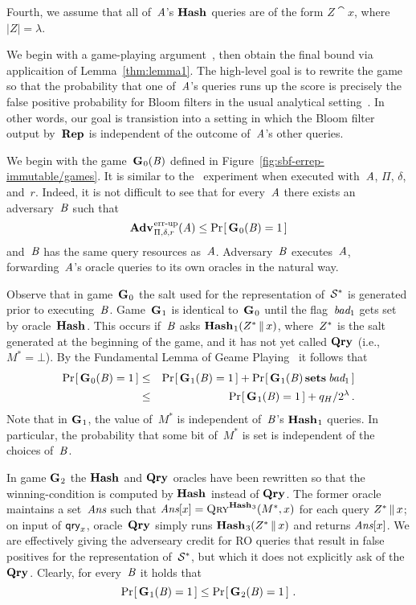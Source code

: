 Fourth, we assume that all of~$\mathit{A}$'s $\textup{\textbf{Hash}}\hspace{0.5pt}$ queries are of the form $Z\cat
x$, where $|Z| = \lambda$.

We begin with a game-playing argument~\cite{bellare2006triple}, then obtain the
final bound via applicaition of Lemma~\ref{thm:lemma1}.
%
%
The high-level goal is to rewrite the game so that the probability that one
of~$\mathit{A}$'s queries runs up the score is precisely the false positive
probability for Bloom filters in the usual analytical
setting~\cite{kirsch2006less}. In other words, our goal is transistion into a
setting in which the Bloom filter output by~$\textup{\textbf{Rep}}\hspace{0.5pt}$ is independent of the
outcome of~$\mathit{A}$'s other queries.

We begin with the game~$\textup{\textbf{G}}\hspace{0.5pt}_0(\mathit{B})$ defined in
Figure~\ref{fig:sbf-errep-immutable/games}. It is similar to the \errep\ experiment when
executed with~$\mathit{A}$, $\Pi$, $\delta$, and~$r$. Indeed, it is not difficult to
see that for every~$\mathit{A}$ there exists an adversary~$\mathit{B}$ such that
\begin{equation}
  \Adv{\errep}_{\Pi,\delta,r}(\advA) \leq \Prob{\game_0(\advB) = 1}
\end{equation}
and~$\mathit{B}$ has the same query resources as~$\mathit{A}$.
%
Adversary~$\mathit{B}$ executes~$\mathit{A}$, forwarding~$\mathit{A}$'s oracle queries
to its own oracles in the natural way.

Observe that in game~$\textup{\textbf{G}}\hspace{0.5pt}_0$ the salt used for the representation of~$\mathcal{S}^*$
is generated prior to executing~$\mathit{B}$. Game~$\textup{\textbf{G}}\hspace{0.5pt}_1$ is identical
to~$\textup{\textbf{G}}\hspace{0.5pt}_0$ until the flag~$\textit{bad}_1$ gets set by oracle~$\textup{\textbf{Hash}}\hspace{0.5pt}$. This occurs
if~$\mathit{B}$ asks $\textup{\textbf{Hash}}\hspace{0.5pt}_1(Z^* \, \| \, x)$, where~$Z^*$ is the salt generated
at the beginning of the game, and it has not yet called $\textup{\textbf{Qry}}\hspace{0.5pt}$ (i.e.,
$M^*=\bot$).
%
By the Fundamental Lemma of Geame Playing~\cite{bellare2006triple} it follows
that
%
\begin{eqnarray}
  \Pr\hspace{-1pt}\left[\,\textup{\textbf{G}}\hspace{0.5pt}_0(\mathit{B})=1\,\right] &\leq&
    \Pr\hspace{-1pt}\left[\,\textup{\textbf{G}}\hspace{0.5pt}_1(\mathit{B})=1\,\right] + \Pr\hspace{-1pt}\left[\,\textup{\textbf{G}}\hspace{0.5pt}_1(\mathit{B}) \,\textup{\textbf{sets}}\hspace{0.5pt}\, \textit{bad}_1\,\right]\\
  &\leq&
    \Pr\hspace{-1pt}\left[\,\textup{\textbf{G}}\hspace{0.5pt}_1(\mathit{B})=1\,\right] + q_H/2^\lambda \,.
\end{eqnarray}
%
Note that in $\textup{\textbf{G}}\hspace{0.5pt}_1$, the value of~$M^*$ is independent of~$\mathit{B}$'s
$\textup{\textbf{Hash}}\hspace{0.5pt}_1$ queries. In particular, the probability that some bit of~$M^*$ is set
is independent of the choices of~$\mathit{B}$.

In game $\textup{\textbf{G}}\hspace{0.5pt}_2$ the $\textup{\textbf{Hash}}\hspace{0.5pt}$ and $\textup{\textbf{Qry}}\hspace{0.5pt}$ oracles have been rewritten so that
the winning-condition is computed by $\textup{\textbf{Hash}}\hspace{0.5pt}$ instead of $\textup{\textbf{Qry}}\hspace{0.5pt}$. The former
oracle maintains a set~$\textit{Ans}$ such that $\textit{Ans}[x] = \textnormal{\textsc{Qry}}^{\textup{\textbf{Hash}}\hspace{0.5pt}_3}(M^*, x)$ for
each query $Z^* \, \| \, x$; on input of $\mathsf{qry}_x$, oracle~$\textup{\textbf{Qry}}\hspace{0.5pt}$ simply runs
$\textup{\textbf{Hash}}\hspace{0.5pt}_3(Z^* \, \| \, x)$ and returns $\textit{Ans}[x]$.
%
We are effectively giving the adverseary credit for RO queries that result in
false positives for the representation of~$\mathcal{S}^*$, but which it does not
explicitly ask of the~$\textup{\textbf{Qry}}\hspace{0.5pt}$. Clearly, for every~$\mathit{B}$ it holds that
%
\begin{equation}
  \Pr\hspace{-1pt}\left[\,\textup{\textbf{G}}\hspace{0.5pt}_1(\mathit{B})=1\,\right] \leq \Pr\hspace{-1pt}\left[\,\textup{\textbf{G}}\hspace{0.5pt}_2(\mathit{B})=1\,\right] \,.
\end{equation}


